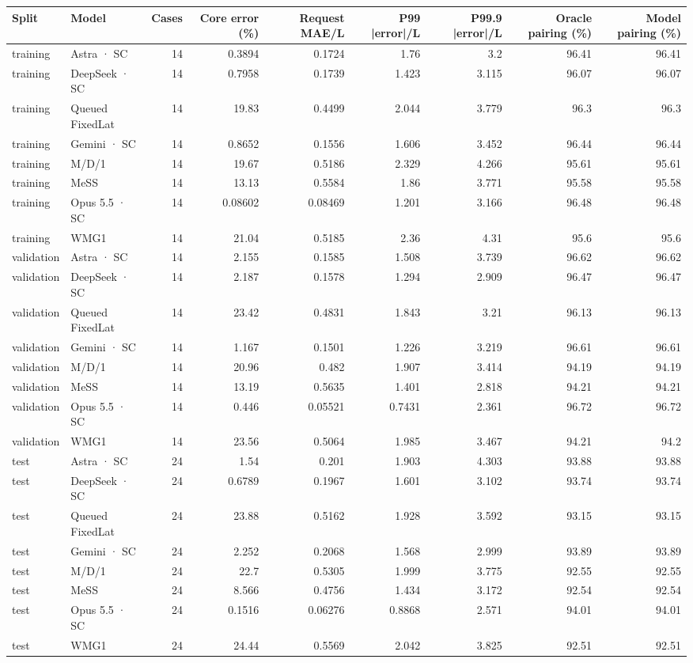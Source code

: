 \begin{tabular}{llrrrrrrr}
\toprule
Split & Model & Cases & Core error (\%) & Request MAE/L & P99 |error|/L & P99.9 |error|/L & Oracle pairing (\%) & Model pairing (\%) \\
\midrule
training & Astra · SC & 14 & 0.3894 & 0.1724 & 1.76 & 3.2 & 96.41 & 96.41 \\
training & DeepSeek · SC & 14 & 0.7958 & 0.1739 & 1.423 & 3.115 & 96.07 & 96.07 \\
training & Queued FixedLat & 14 & 19.83 & 0.4499 & 2.044 & 3.779 & 96.3 & 96.3 \\
training & Gemini · SC & 14 & 0.8652 & 0.1556 & 1.606 & 3.452 & 96.44 & 96.44 \\
training & M/D/1 & 14 & 19.67 & 0.5186 & 2.329 & 4.266 & 95.61 & 95.61 \\
training & MeSS & 14 & 13.13 & 0.5584 & 1.86 & 3.771 & 95.58 & 95.58 \\
training & Opus 5.5 · SC & 14 & 0.08602 & 0.08469 & 1.201 & 3.166 & 96.48 & 96.48 \\
training & WMG1 & 14 & 21.04 & 0.5185 & 2.36 & 4.31 & 95.6 & 95.6 \\
validation & Astra · SC & 14 & 2.155 & 0.1585 & 1.508 & 3.739 & 96.62 & 96.62 \\
validation & DeepSeek · SC & 14 & 2.187 & 0.1578 & 1.294 & 2.909 & 96.47 & 96.47 \\
validation & Queued FixedLat & 14 & 23.42 & 0.4831 & 1.843 & 3.21 & 96.13 & 96.13 \\
validation & Gemini · SC & 14 & 1.167 & 0.1501 & 1.226 & 3.219 & 96.61 & 96.61 \\
validation & M/D/1 & 14 & 20.96 & 0.482 & 1.907 & 3.414 & 94.19 & 94.19 \\
validation & MeSS & 14 & 13.19 & 0.5635 & 1.401 & 2.818 & 94.21 & 94.21 \\
validation & Opus 5.5 · SC & 14 & 0.446 & 0.05521 & 0.7431 & 2.361 & 96.72 & 96.72 \\
validation & WMG1 & 14 & 23.56 & 0.5064 & 1.985 & 3.467 & 94.21 & 94.2 \\
test & Astra · SC & 24 & 1.54 & 0.201 & 1.903 & 4.303 & 93.88 & 93.88 \\
test & DeepSeek · SC & 24 & 0.6789 & 0.1967 & 1.601 & 3.102 & 93.74 & 93.74 \\
test & Queued FixedLat & 24 & 23.88 & 0.5162 & 1.928 & 3.592 & 93.15 & 93.15 \\
test & Gemini · SC & 24 & 2.252 & 0.2068 & 1.568 & 2.999 & 93.89 & 93.89 \\
test & M/D/1 & 24 & 22.7 & 0.5305 & 1.999 & 3.775 & 92.55 & 92.55 \\
test & MeSS & 24 & 8.566 & 0.4756 & 1.434 & 3.172 & 92.54 & 92.54 \\
test & Opus 5.5 · SC & 24 & 0.1516 & 0.06276 & 0.8868 & 2.571 & 94.01 & 94.01 \\
test & WMG1 & 24 & 24.44 & 0.5569 & 2.042 & 3.825 & 92.51 & 92.51 \\
\bottomrule
\end{tabular}
